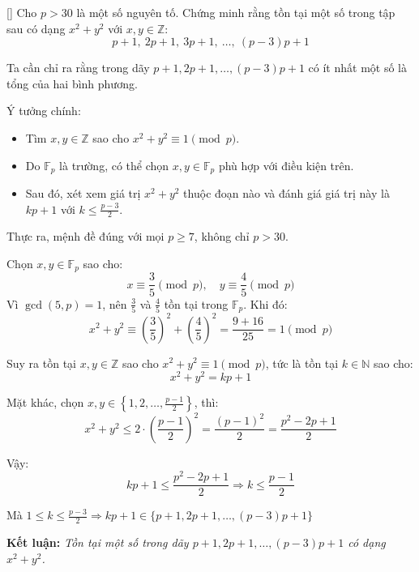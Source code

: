 \documentclass[../09-contruction-methods.tex]{subfiles}
\begin{document}
\begin{example*}\label{example:IRN-2015-MO-N5}[\textbf{}]
	Cho \( p > 30 \) là một số nguyên tố. Chứng minh rằng tồn tại một số trong tập sau có dạng \( x^2 + y^2 \) với \( x, y \in \mathbb{Z} \):
	\[
		p + 1,\ 2p + 1,\ 3p + 1,\ \dots,\ (p - 3)p + 1
	\]
\end{example*}

\begin{story*}
	Ta cần chỉ ra rằng trong dãy \( p + 1, 2p + 1, \dots, (p - 3)p + 1 \) có ít nhất một số là tổng của hai bình phương.

	Ý tưởng chính:
	\begin{itemize}[topsep=0pt, partopsep=0pt, itemsep=0pt]
		\item Tìm \( x, y \in \mathbb{Z} \) sao cho \( x^2 + y^2 \equiv 1 \pmod{p} \).
		\item Do \( \mathbb{F}_p \) là trường, có thể chọn \( x, y \in \mathbb{F}_p \) phù hợp với điều kiện trên.
		\item Sau đó, xét xem giá trị \( x^2 + y^2 \) thuộc đoạn nào và đánh giá giá trị này là \( kp + 1 \) với \( k \le \tfrac{p - 3}{2} \).
	\end{itemize}
\end{story*}

\bigbreak

\begin{soln}\footnotemark
	Thực ra, mệnh đề đúng với mọi \( p \ge 7 \), không chỉ \( p > 30 \).

	Chọn \( x, y \in \mathbb{F}_p \) sao cho:
	\[
		x \equiv \frac{3}{5} \pmod{p}, \quad y \equiv \frac{4}{5} \pmod{p}
	\]
	Vì \( \gcd(5, p) = 1 \), nên \( \tfrac{3}{5} \) và \( \tfrac{4}{5} \) tồn tại trong \( \mathbb{F}_p \). Khi đó:
	\[
		x^2 + y^2 \equiv \left( \frac{3}{5} \right)^2 + \left( \frac{4}{5} \right)^2 = \frac{9 + 16}{25} = 1 \pmod{p}
	\]

	Suy ra tồn tại \( x, y \in \mathbb{Z} \) sao cho \( x^2 + y^2 \equiv 1 \pmod{p} \), tức là tồn tại \( k \in \mathbb{N} \) sao cho:
	\[
		x^2 + y^2 = kp + 1
	\]

	Mặt khác, chọn \( x, y \in \left\{1, 2, \dotsc, \frac{p - 1}{2} \right\} \), thì:
	\[
		x^2 + y^2 \le 2 \cdot \left( \frac{p - 1}{2} \right)^2 = \frac{(p - 1)^2}{2} = \frac{p^2 - 2p + 1}{2}
	\]

	Vậy:
	\[
		kp + 1 \le \frac{p^2 - 2p + 1}{2} \Rightarrow k \le \frac{p - 1}{2}
	\]

	Mà \( 1 \le k \le \frac{p - 3}{2} \Rightarrow kp + 1 \in \{p + 1, 2p + 1, \dotsc, (p - 3)p + 1\} \)

	\textbf{Kết luận:} \textit{Tồn tại một số trong dãy \( p + 1, 2p + 1, \dotsc, (p - 3)p + 1 \) có dạng \( x^2 + y^2 \).}
\end{soln}

\end{document}
